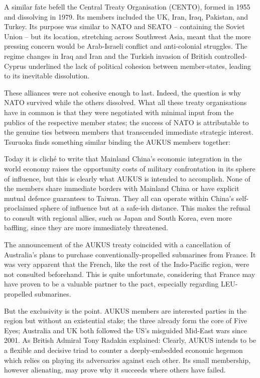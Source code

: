 \documentclass[letterpaper,12pt,twoside]{article} %
\begin{document}
\begin{multicols}{2}
A similar fate befell the Central Treaty Organisation (CENTO), formed in 1955 and dissolving in 1979. Its members included the UK, Iran, Iraq, Pakistan, and Turkey. Its purpose was similar to NATO and SEATO -- containing the Soviet Union -- but its location, stretching across Southwest Asia, meant that the more pressing concern would be Arab-Israeli conflict and anti-colonial struggles. The regime changes in Iraq and Iran and the Turkish invasion of British controlled-Cyprus underlined the lack of political cohesion between member-states, leading to its inevitable dissolution.

These alliances were not cohesive enough to last. Indeed, the question is why NATO survived while the others dissolved. What all these treaty organisations have in common is that they were negotiated with minimal input from the publics of the respective member states; the success of NATO is attributable to the genuine ties between members that transcended immediate strategic interest. Tsuruoka finds something similar binding the AUKUS members together: \autocite[3]{tsuruoka2021aukus}

Today it is cliché to write that Mainland China's economic integration in the world economy raises the opportunity costs of military confrontation in its sphere of influence, but this is clearly what AUKUS is intended to accomplish. None of the members share immediate borders with Mainland China or have explicit mutual defence guarantees to Taiwan. They all can operate within China's self-proclaimed sphere of influence but at a safe-ish distance. This makes the refusal to consult with regional allies, such as Japan and South Korea, even more baffling, since they are more immediately threatened.

The announcement of the AUKUS treaty coincided with a cancellation of Australia's plans to purchase conventionally-propelled submarines from France. It was very apparent that the French, like the rest of the Indo-Pacific region, were not consulted beforehand.\autocite[3]{perot2021aukus} This is quite unfortunate, considering that France may have proven to be a valuable partner to the pact, especially regarding LEU-propelled submarines.

But the exclusivity is the point. AUKUS members are interested parties in the region but without an existential stake; the three already form the core of Five Eyes; Australia and UK both followed the US's misguided Mid-East wars since 2001. As British Admiral Tony Radakin explained: \autocite[4]{tsuruoka2021aukus} Clearly, AUKUS intends to be a flexible and decisive triad to counter a deeply-embedded economic hegemon which relies on playing its adversaries against each other. Its small membership, however alienating, may prove why it succeeds where others have failed.


\end{multicols}
\end{document}
